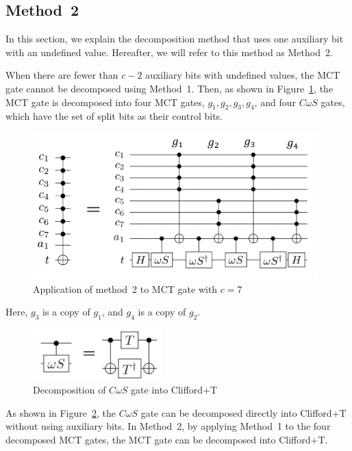\subsection{Method~2}
In this section, we explain the decomposition method \cite{abdessaied2016technology} that uses one auxiliary bit with an undefined value.
Hereafter, we will refer to this method as Method~2.
\par
When there are fewer than $c-2$ auxiliary bits with undefined values, the MCT gate cannot be decomposed using Method~1.
Then, as shown in Figure~\ref{mimap},
the MCT gate is decomposed into four MCT gates,
$g_{1}, g_{2}, g_{3}, g_{4}$, and four $C\omega S$ gates,
which have the set of split bits as their control bits.
\begin{figure}[tbp]
\centering
\includegraphics[width=11cm]{img/mimapping.pdf}
\caption{Application of method~2 to MCT gate with $c=7$}
\label{mimap}
\end{figure}
Here, $g_{3}$ is a copy of $g_{1}$, and $g_{4}$ is a copy of $g_{2}$.
\begin{figure}[tbp]
\centering
\includegraphics[width=5cm]{img/comegas.pdf}
\caption{Decomposition of $C\omega S$ gate into Clifford+T}
\label{comegas}
\end{figure}
As shown in Figure~\ref{comegas},
the $C\omega S$ gate can be decomposed directly into Clifford+T without using auxiliary bits.
In Method~2,
by applying Method~1 to the four decomposed MCT gates,
the MCT gate can be decomposed into Clifford+T.
\par

